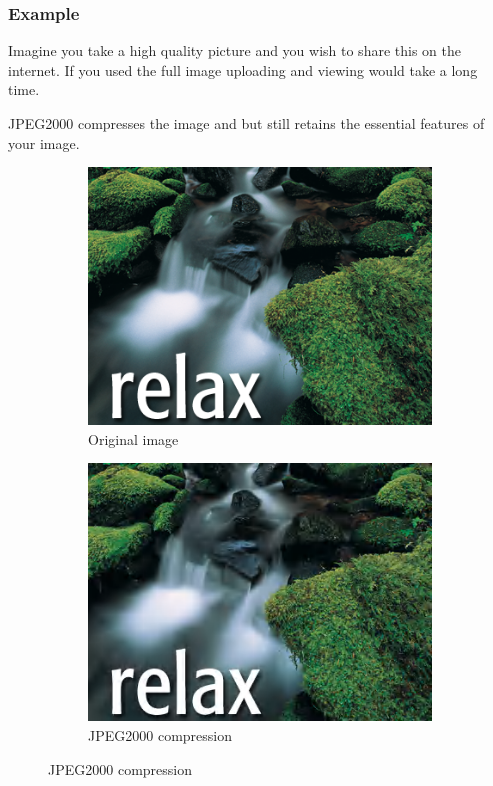 \documentclass{beamer}
\begin{document}
\begin{frame}
  \frametitle{Example}
Imagine you take a high quality picture and you wish to share this on the internet. If you used the full image uploading and viewing would take a long time. 

JPEG2000 compresses the image and but still retains the essential features of your image.

\begin{figure}
        \centering
        \begin{subfigure}[b]{0.4\textwidth}
                \centering
                \includegraphics[width=\textwidth]{relax1}
                \caption{Original image}
                \label{fig:gull}
        \end{subfigure}
        \begin{subfigure}[b]{0.4\textwidth}
                \centering
                \includegraphics[width=\textwidth]{relax2}
                \caption{JPEG2000 compression}
                \label{fig:tiger}
        \end{subfigure}

\end{figure}

\end{frame}
\end{document}
